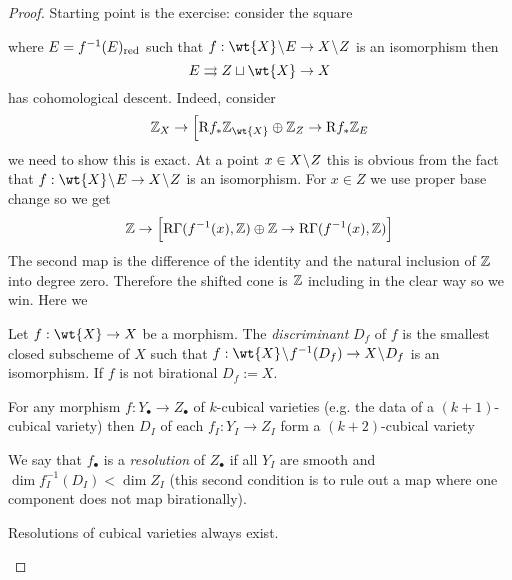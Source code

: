 \documentclass[12pt]{article}
\newcommand{\R}{\mathrm{R}}
\begin{document}
\begin{proof}
Starting point is the exercise: consider the square
\begin{center}
\end{center}
where $E = f^{-1}(E)_{\mathrm{red}}$ such that $f : \wt{X} \sm E \to X \sm Z$ is an isomorphism then 
\[ E \parallelto Z \sqcup \wt{X} \to X \]
has cohomological descent. Indeed, consider
\[ \Z_X \to \Big[ \R f_* \Z_{\wt{X}} \oplus \Z_{Z} \to \R f_*\Z_{E} \]
we need to show this is exact. At a point $x \in X \! \setminus \! Z$ this is obvious from the fact that $f : \wt{X} \sm E \to X \sm Z$ is an isomorphism. For $x \in Z$ we use proper base change so we get
\[ \Z \to \Big[ \R \Gamma(f^{-1}(x), \Z) \oplus \Z \to \R \Gamma(f^{-1}(x), \Z) \Big] \]
The second map is the difference of the identity and the natural inclusion of $\mathbb{Z}$ into degree zero. Therefore the shifted cone is $\mathbb{Z}$ including in the clear way so we win. Here we 

\begin{defn}
Let $f : \wt{X} \to X$ be a morphism. The \textit{discriminant} $D_f$ of $f$ is the smallest closed subscheme of $X$ such that $f : \wt{X} \sm f^{-1}(D_f) \to X \sm D_f$ is an isomorphism. If $f$ is not birational $D_f := X$. 
\end{defn}

For any morphism $f : Y_\bullet \to Z_\bullet$ of $k$-cubical varieties (e.g. the data of a $(k+1)$-cubical variety) then $D_I$ of each $f_I : Y_I \to Z_I$ form a $(k+2)$-cubical variety
\begin{center}
\end{center}

\begin{defn}
We say that $f_\bullet$ is a \textit{resolution} of $Z_\bullet$ if all $Y_I$ are smooth and $\dim f_I^{-1}(D_I) < \dim{Z_I}$ (this second condition is to rule out a map where one component does not map birationally).
\end{defn}

\begin{prop}
Resolutions of cubical varieties always exist.
\end{prop}


\end{proof}
\end{document}

